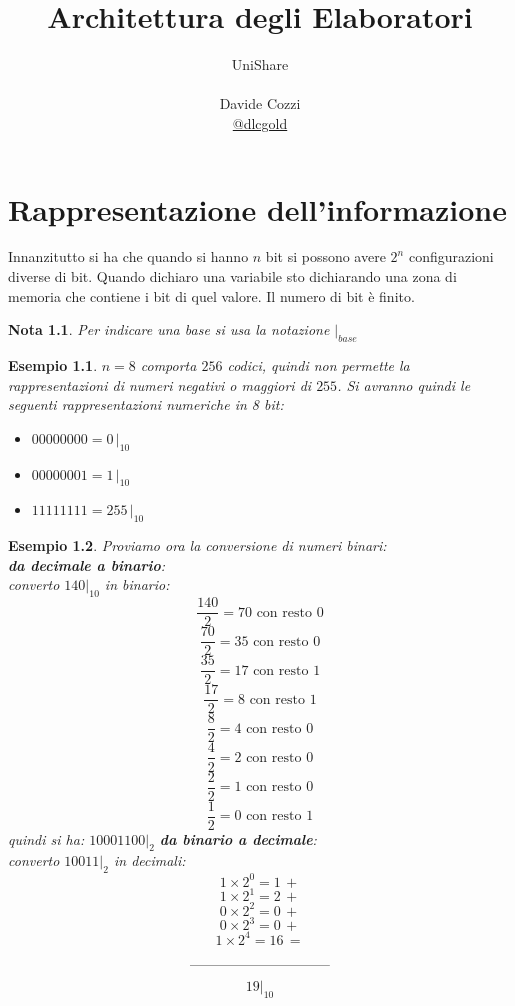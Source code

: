 \documentclass[a4paper,12pt, oneside]{book}
\title{Architettura degli Elaboratori}
\author{UniShare\\\\Davide Cozzi\\\href{https://t.me/dlcgold}{@dlcgold}\\}
\date{}
\begin{document}
\maketitle


\newtheorem{teorema}{Teorema}
\newtheorem{definizione}{Definizione}
\newtheorem{esempio}{Esempio}
\newtheorem{corollario}{Corollario}
\newtheorem{lemma}{Lemma}
\newtheorem{osservazione}{Osservazione}
\newtheorem{nota}{Nota}
\newtheorem{esercizio}{Esercizio}
\tableofcontents
\renewcommand{\chaptermark}[1]{%
\markboth{\chaptername
\ \thechapter.\ #1}{}}
\renewcommand{\sectionmark}[1]{\markright{\thesection.\ #1}}
\chapter{Rappresentazione dell'informazione}
Innanzitutto si ha che quando si hanno $n$ bit si possono avere $2^n$ configurazioni diverse di bit. Quando dichiaro una variabile sto dichiarando una zona di memoria che contiene i bit di quel valore. Il numero di bit è finito.
\begin{nota}
Per indicare una base si usa la notazione $|_{base}$
\end{nota}
\begin{esempio}
$n=8$ comporta $256$ codici, quindi non permette la rappresentazioni di numeri negativi o maggiori di $255$. Si avranno quindi le seguenti rappresentazioni numeriche in 8 bit:
\begin{itemize}
\item $00000000=0\,|_{10}$
\item $00000001=1\,|_{10}$
\item $11111111=255\,|_{10}$
\end{itemize}
\end{esempio}
\begin{esempio}
Proviamo ora la conversione di numeri binari:\\
\textbf{da decimale a binario}:\\
converto $140|_{10}$ in binario:
$$\frac{140}{2}=70 \mbox{ con resto } 0$$
$$\frac{70}{2}=35 \mbox{ con resto } 0$$
$$\frac{35}{2}=17 \mbox{ con resto } 1$$
$$\frac{17}{2}=8 \mbox{ con resto } 1$$
$$\frac{8}{2}=4 \mbox{ con resto } 0$$
$$\frac{4}{2}=2 \mbox{ con resto } 0$$
$$\frac{2}{2}=1 \mbox{ con resto } 0$$
$$\frac{1}{2}=0 \mbox{ con resto } 1$$
quindi si ha: $10001100|_{2}$
\textbf{da binario a decimale}:\\
converto $10011|_{2}$ in decimali:
$$1\times 2^0=1\,+$$
$$1\times 2^1=2\,+$$
$$0\times 2^2=0\,+$$
$$0\times 2^3=0\,+$$
$$1\times 2^4=16\,=$$
$$\rule{100pt}{.4pt}$$
$$19|_{10}$$
\end{esempio}
\end{document}
